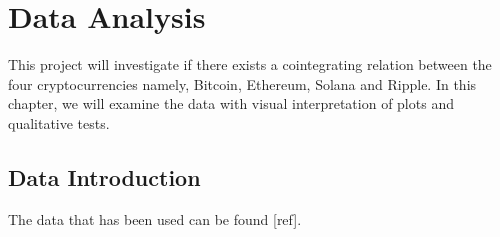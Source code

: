 \chapter{Data Analysis}
This project will investigate if there exists a cointegrating relation between the four cryptocurrencies namely, Bitcoin, Ethereum, Solana and Ripple. In this chapter, we will examine the data with visual interpretation of plots and qualitative tests.

\section{Data Introduction}
The data that has been used can be found [ref].\\

